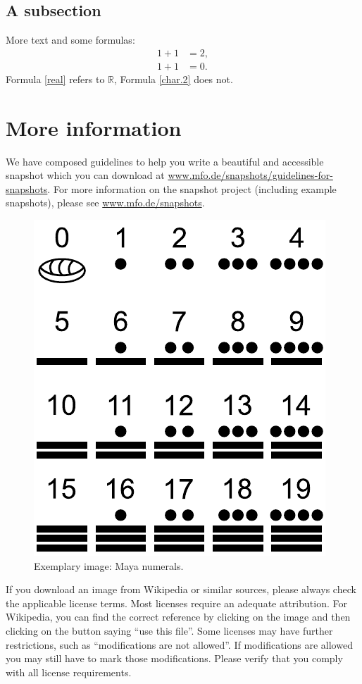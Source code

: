 \documentclass{snapshotmfo}
\begin{document}
\subsection{A subsection}
More text and some formulas:
\begin{align}\label{real}
1+1&=2,\\\label{char.2}
1+1&=0.
\end{align}
Formula \eqref{real} refers to $\mathbb{R}$, Formula \eqref{char.2} does not.

\section{More information}
We have composed guidelines to help you write a beautiful and accessible snapshot which you can download at \href{https://www.mfo.de/snapshots/guidelines-for-snapshots}{www.mfo.de/snapshots/guidelines-for-snapshots}. For more information on the snapshot project (including example snapshots), please see \href{https://www.mfo.de/snapshots}{www.mfo.de/snapshots}.

\begin{figure}[ht]
        \centering
        \includegraphics[width= 0.33 \textwidth]{maya.pdf}
        \caption{Exemplary image: Maya numerals.}
\label{fig.maya}
\end{figure}

If you download an image from Wikipedia or similar sources, please always check the applicable license terms. Most licenses require an adequate attribution. For Wikipedia, you can find the correct reference by clicking on the image and then clicking on the button saying ``use this file''. Some licenses may have further restrictions, such as ``modifications are not allowed''. If modifications are allowed you may still have to mark those modifications. Please verify that you comply with all license requirements.
\end{document}

